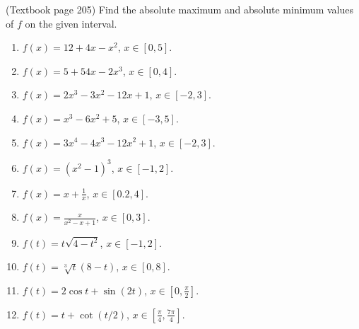 (Textbook page 205)
Find the absolute maximum and absolute minimum values of $f$ on the given interval.
\begin{multicols}{3}
\begin{enumerate}
\item $f(x)=12+4x-x^2$, $x\in [0,5]$.
\item $f(x)=5+54x-2x^3$, $x\in[0,4] $.
\item $f(x)=2x^3-3x^2-12x+1$, $x\in [-2,3]$.
\item $f(x)=x^3-6x^2+5$, $x\in [-3, 5]$.
\item $f(x)=3x^4-4x^3-12x^2+1$, $x\in [-2, 3]$.
\item $f(x)=(x^2-1)^3$, $x\in [-1, 2]$.
\item $f(x)=x+\frac{1}{x}$, $x\in [0.2,4 ]$.
\item $f(x)=\frac{x}{x^2-x+1}$, $x\in [0,3 ]$.
\item $f(t)=t\sqrt{4-t^2}$, $x\in [-1,2 ]$.
\item $f(t)=\sqrt[3]{t}(8-t) $, $x\in [0,8 ]$.
\item $f(t)=2\cos t+\sin (2t)$, $x\in [0,\frac{\pi}{2} ]$.
\item $f(t)=t+\cot (t/2) $, $x\in [\frac{\pi}{4},\frac{7\pi}{4} ]$.
\end{enumerate}
\end{multicols}

